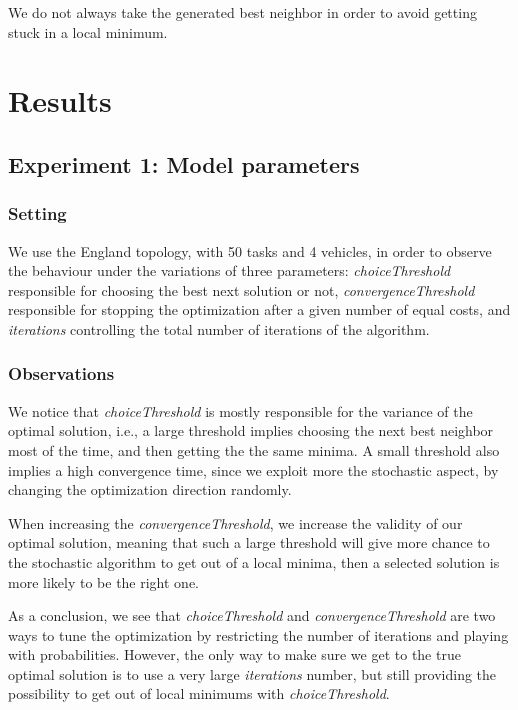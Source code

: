 \documentclass[11pt]{article}
\begin{document}
We do not always take the generated best neighbor in order to avoid getting stuck in a local minimum. 

\section{Results}

\subsection{Experiment 1: Model parameters}

\subsubsection{Setting}
We use the England topology, with 50 tasks and 4 vehicles, in order to observe the behaviour under the variations of three parameters: \textit{choiceThreshold} responsible for choosing the best next solution or not, \textit{convergenceThreshold} responsible for stopping the optimization after a given number of equal costs, and \textit{iterations} controlling the total number of iterations of the algorithm.

\subsubsection{Observations}
We notice that \textit{choiceThreshold} is mostly responsible for the variance of the optimal solution, i.e., a large threshold implies choosing the next best neighbor most of the time, and then getting the the same minima. A small threshold also implies a high convergence time, since we exploit more the stochastic aspect, by changing the optimization direction randomly.

When increasing the \textit{convergenceThreshold}, we increase the validity of our optimal solution, meaning that such a large threshold will give more chance to the stochastic algorithm to get out of a local minima, then a selected solution is more likely to be the right one. 

As a conclusion, we see that \textit{choiceThreshold} and \textit{convergenceThreshold} are two ways to tune the optimization by restricting the number of iterations and playing with probabilities. However, the only way to make sure we get to the true optimal solution is to use a very large \textit{iterations} number, but still providing the possibility to get out of local minimums with \textit{choiceThreshold}.
\end{document}
